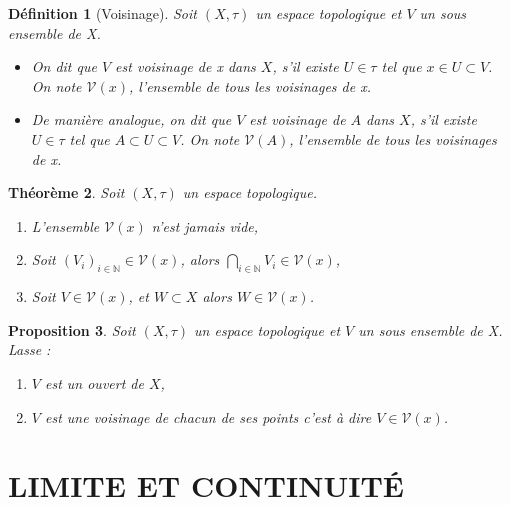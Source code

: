 \documentclass[a4paper, 12pt]{report}
\theoremstyle{break}
\newtheorem{defin}{Définition}[section]
\newtheorem{prop}[defin]{Proposition}
\newtheorem{theo}[defin]{Théorème}
\begin{document}
\begin{defin}[Voisinage]
     Soit $(X,\tau)$ un espace topologique et $V$ un sous ensemble de X.
     \begin{itemize}
            \item On dit que $V$ est voisinage de x dans $X$, s'il existe $U \in \tau$ tel que $x \in U \subset V$. On note $\mathcal{V}(x)$, l'ensemble de tous les voisinages de x.
            \item De manière analogue, on dit que $V$ est voisinage de $A$ dans $X$, s'il existe $U \in \tau$ tel que $A \subset U \subset V$. On note $\mathcal{V}(A)$, l'ensemble de tous les voisinages de x.
     \end{itemize}
\end{defin} 

\begin{theo}
Soit $(X, \tau)$ un espace topologique.
\begin{enumerate}
      \item L'ensemble $\mathcal{V}(x)$ n'est jamais vide,
      \item Soit $(V_{i})_{i \in \mathbb{N}} \in \mathcal{V}(x)$, alors $\displaystyle\bigcap_{i \in \mathbb{N}} V_{i} \in \mathcal{V}(x)$,
      \item Soit $V \in \mathcal{V}(x)$, et $W \subset X$ alors $W \in \mathcal{V}(x)$.
\end{enumerate}
\end{theo}

\begin{prop}
 Soit $(X, \tau)$ un espace topologique et $V$ un sous ensemble de X. Lasse :
 \begin{enumerate}
         \item $V$ est un ouvert de $X$,
         \item $V$ est une voisinage de chacun de ses points c'est à dire $V \in \mathcal{V}(x)$.
 \end{enumerate}
\end{prop}


\chapter{LIMITE ET CONTINUITÉ}
\end{document}
